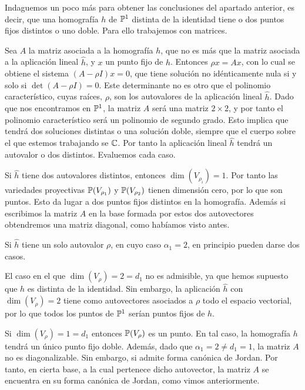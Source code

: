 Indaguemos un poco más para obtener las conclusiones del apartado anterior, es decir, que una homografía $h$ de $\mathbb{P}^1$ distinta de la identidad tiene o dos puntos fijos distintos o uno doble. Para ello trabajemos con matrices.

Sea $A$ la matriz asociada a la homografía $h$, que no es más que la matriz asociada a la aplicación lineal $\widehat{h}$, y $x$ un punto fijo de $h$. Entonces $\rho x=Ax$, con lo cual se obtiene el sistema $(A-\rho I)x=0$, que tiene solución no idénticamente nula si y solo si $\det(A-\rho I)=0$. Este determinante no es otro que el polinomio característico, cuyas raíces, $\rho$, son los autovalores de la aplicación lineal $\widehat{h}$. Dado que nos encontramos en $\mathbb{P}^1$, la matriz $A$ será una matriz $2\times 2$, y por tanto el polinomio característico será un polinomio de segundo grado. Esto implica que tendrá dos soluciones distintas o una solución doble, siempre que el cuerpo sobre el que estemos trabajando se $\mathbb{C}$. Por tanto la aplicación lineal $\widehat{h}$ tendrá un autovalor o dos distintos. Evaluemos cada caso.

Si $\widehat{h}$ tiene dos autovalores distintos, entonces $\dim(V_{\rho_i})=1$. Por tanto las variedades proyectivas $\mathbb{P}(V_{\rho_1})$ y $\mathbb{P}(V_{\rho_2})$ tienen dimensión cero, por lo que son puntos. Esto da lugar a dos puntos fijos distintos en la homografía. Además si escribimos la matriz $A$ en la base formada por estos dos autovectores obtendremos una matriz diagonal, como habíamos visto antes.

Si $\widehat{h}$ tiene un solo autovalor $\rho$, en cuyo caso $\alpha_1=2$, en principio pueden darse dos casos.

El caso en el que $\dim(V_{\rho})=2=d_1$ no es admisible, ya que hemos supuesto que $h$ es distinta de la identidad. Sin embargo, la aplicación $\widehat{h}$ con $\dim(V_{\rho})=2$ tiene como autovectores asociados a $\rho$ todo el espacio vectorial, por lo que todos los puntos de $\mathbb{P}^1$ serían puntos fijos de $h$.

Si $\dim(V_{\rho})=1=d_1$ entonces $\mathbb{P}(V_{\rho})$ es un punto. En tal caso, la homografía $h$ tendrá un único punto fijo doble. Además, dado que $\alpha_1=2\not=d_1=1$, la matriz $A$ no es diagonalizable. Sin embargo, si admite forma canónica de Jordan. Por tanto, en cierta base, a la cual pertenece dicho autovector, la matriz $A$ se encuentra en su forma canónica de Jordan, como vimos anteriormente.\\

